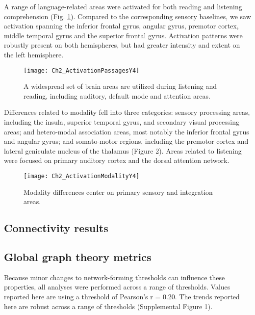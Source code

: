A range of language-related areas were activated for both reading and listening comprehension (Fig. \ref{fig2:passages}). Compared to the corresponding sensory baselines, we saw activation spanning the inferior frontal gyrus, angular gyrus, premotor cortex, middle temporal gyrus and the superior frontal gyrus. Activation patterns were robustly present on both hemispheres, but had greater intensity and extent on the left hemisphere. 

\begin{figure}[tp]
	\centering
	\texttt{[image: Ch2\_ActivationPassagesY4]}
    \caption[There is significant overlap between the areas used in listening and reading.]{A widespread set of brain areas are utilized during listening and reading, including auditory, default mode and attention areas.}
	\label{fig2:passages}
\end{figure}

Differences related to modality fell into three categories: sensory processing areas, including the insula, superior temporal gyrus, and secondary visual processing areas; and hetero-modal association areas, most notably the inferior frontal gyrus and angular gyrus; and somato-motor regions, including the premotor cortex and lateral geniculate nucleus of the thalamus (Figure 2). Areas related to listening were focused on primary auditory cortex and the dorsal attention network. 

\begin{figure}[!b]
	\centering
	\texttt{[image: Ch2\_ActivationModalityY4]}
    \caption[Modality differences center on primary sensory and integration areas.]{Modality differences center on primary sensory and integration areas.}
	\label{fig2:modality}
\end{figure}

\subsection{Connectivity results}




\subsection{Global graph theory metrics}
Because minor changes to network-forming thresholds can influence these properties, all analyses were performed across a range of thresholds. Values reported here are using a threshold of Pearson’s r = 0.20. The trends reported here are robust across a range of thresholds (Supplemental Figure 1). 

